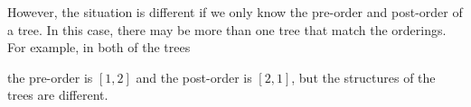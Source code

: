 However, the situation is different if we only know
the pre-order and post-order of a tree.
In this case, there may be more than one tree
that match the orderings.
For example, in both of the trees
\begin{center}
\end{center}
the pre-order is $[1,2]$ and the post-order is $[2,1]$,
but the structures of the trees are different.


